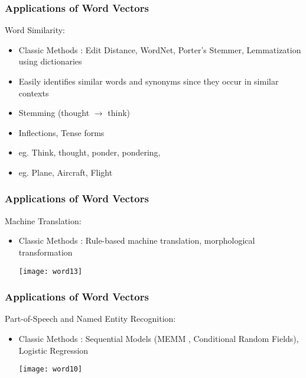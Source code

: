 \begin{frame}[fragile]\frametitle{Applications of Word Vectors}
Word Similarity:

\begin{itemize}
\item Classic Methods :  Edit Distance, WordNet, Porter's Stemmer, Lemmatization using dictionaries
\item Easily identifies similar words and synonyms since they occur in similar contexts
\item Stemming (thought $\rightarrow$ think) 
\item Inflections, Tense forms
\item eg. Think, thought, ponder, pondering,
\item eg. Plane, Aircraft, Flight
\end{itemize}
\end{frame}


\begin{frame}[fragile]\frametitle{Applications of Word Vectors}
Machine Translation:

\begin{itemize}
\item Classic Methods :  Rule-based machine translation, morphological transformation
\begin{center}
\texttt{[image: word13]}
\end{center}
\end{itemize}
\end{frame}

\begin{frame}[fragile]\frametitle{Applications of Word Vectors}
Part-of-Speech and Named Entity Recognition:

\begin{itemize}
\item Classic Methods :  Sequential Models (MEMM , Conditional Random Fields),  Logistic Regression
\begin{center}
\texttt{[image: word10]}
\end{center}
\end{itemize}
\end{frame}
%
%

